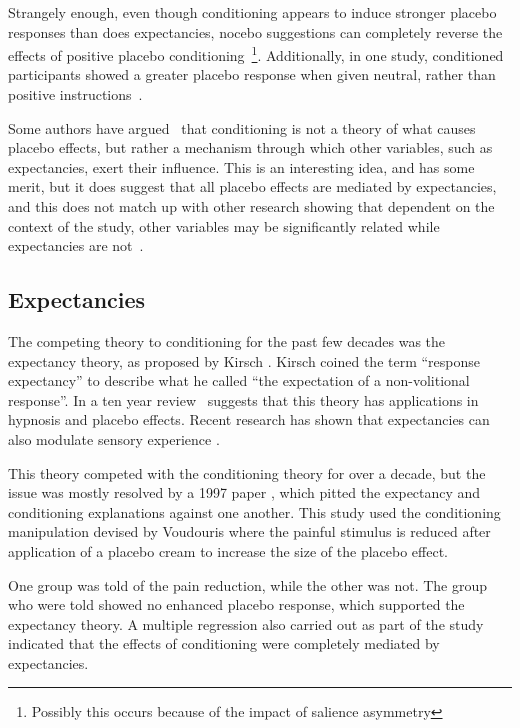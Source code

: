 Strangely enough, even though conditioning appears to induce stronger placebo responses than does expectancies, nocebo suggestions can completely reverse the effects of positive placebo conditioning~\cite{Benedetti2008}\footnote{Possibly this occurs because of the impact of salience asymmetry}. Additionally, in one study, conditioned participants showed a greater placebo response when given neutral, rather than positive instructions~\cite{Klinger2007a}. 

Some authors have argued~\cite{Stewart-Williams2004b} that conditioning is not a theory of what causes placebo effects, but rather a mechanism through which other variables, such as expectancies, exert their influence. This is an interesting idea, and has some merit, but it does suggest that all placebo effects are mediated by expectancies, and this does not match up with other research showing that dependent on the context of the study, other variables may be significantly related while expectancies are not~\cite{Geers2005a,Hyland2006}.  

\subsection{Expectancies}
\label{sec:expectancies}

The competing theory to conditioning for the past few decades was the expectancy theory, as proposed by Kirsch \cite{Kirsch1985}. Kirsch coined the term ``response expectancy'' to describe what he called ``the expectation of a non-volitional response''. In a ten year review~\cite{Kirsch1997} suggests that this theory has applications in hypnosis and placebo effects. Recent research has shown that expectancies can also modulate sensory experience  \cite{Sterzer2008}. 

This theory competed with the conditioning theory for over a decade, but the issue was mostly resolved by a 1997 paper \cite{Montgomery1997}, which pitted the expectancy and conditioning explanations against one another. This study used the conditioning manipulation devised by Voudouris \cite{Voudouris1985} where the painful stimulus is reduced after application of a placebo cream to increase the size of the placebo effect. 

One group was told of the pain reduction, while the other was not. The group who were told showed no enhanced placebo response, which supported the expectancy theory. A multiple regression also carried out as part of the study indicated that the effects of conditioning were completely mediated by expectancies. 

